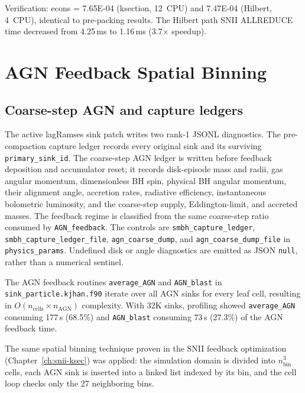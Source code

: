 \documentclass[11pt,fleqn]{book}
\begin{document}
Verification: econs = 7.65E-04 (ksection, 12~CPU) and 7.47E-04 (Hilbert, 4~CPU), identical to pre-packing results. The Hilbert path SNII ALLREDUCE time decreased from 4.25\,ms to 1.16\,ms (3.7$\times$ speedup).


\chapter{AGN Feedback Spatial Binning}
\label{ch:agn-binning}

\section{Coarse-step AGN and capture ledgers}

The active lagRamses sink patch writes two rank-1 JSONL diagnostics.  The
pre-compaction capture ledger records every original sink and its surviving
\texttt{primary\_sink\_id}.  The coarse-step AGN ledger is written before
feedback deposition and accumulator reset; it records disk-episode mass and
radii, gas angular momentum, dimensionless BH spin, physical BH angular
momentum, their alignment angle, accretion rates,
radiative efficiency, instantaneous bolometric luminosity, and the
coarse-step supply, Eddington-limit, and accreted masses.  The feedback regime
is classified from the same coarse-step ratio consumed by
\texttt{AGN\_feedback}.  The controls are
\texttt{smbh\_capture\_ledger}, \texttt{smbh\_capture\_ledger\_file},
\texttt{agn\_coarse\_dump}, and \texttt{agn\_coarse\_dump\_file} in
\texttt{physics\_params}.  Undefined disk or angle diagnostics are emitted as
JSON \texttt{null}, rather than a numerical sentinel.

The AGN feedback routines \texttt{average\_AGN} and \texttt{AGN\_blast} in \texttt{sink\_particle.kjhan.f90} iterate over all AGN sinks for every leaf cell, resulting in $O(n_\mathrm{cells} \times n_\mathrm{AGN})$ complexity. With 32K sinks, profiling showed \texttt{average\_AGN} consuming 177\,s (68.5\%) and \texttt{AGN\_blast} consuming 73\,s (27.3\%) of the AGN feedback time.

The same spatial binning technique proven in the SNII feedback optimization (Chapter~\ref{ch:snii-ksec}) was applied: the simulation domain is divided into $n_\mathrm{bin}^3$ cells, each AGN sink is inserted into a linked list indexed by its bin, and the cell loop checks only the 27 neighboring bins.
\end{document}
